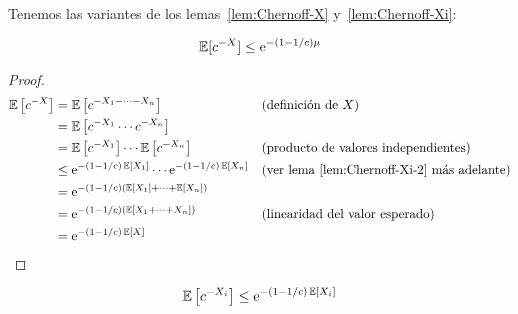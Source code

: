   Tenemos las variantes
  de los lemas~\ref{lem:Chernoff-X} y~\ref{lem:Chernoff-Xi}:
  \begin{lemma}
    \label{lem:Chernoff-X-2}
    \begin{equation*}
      \operatorname{\mathbb{E}}[c^{-X}]
        \le \mathrm{e}^{- (1 - 1 / c) \mu}
    \end{equation*}
  \end{lemma}
  \begin{proof}
    \begin{align*}
      \operatorname{\mathbb{E}}\left[ c^{-X} \right]
        &= \operatorname{\mathbb{E}}\left[ c^{-X_1 - \dotsb - X_n} \right]
               && \text{(definición de \(X\))} \\
        &=   \operatorname{\mathbb{E}}\left[ c^{-X_1} \dotsm c^{-X_n} \right] \\
        &=   \operatorname{\mathbb{E}}\left[ c^{-X_1} \right] \dotsm \operatorname{\mathbb{E}}\left[ c^{-X_n} \right]
               && \text{(producto de valores independientes)} \\
        &\le \mathrm{e}^{- (1 - 1 / c) \operatorname{\mathbb{E}}[X_1]}
               \dotsm \mathrm{e}^{- (1 - 1 / c) \operatorname{\mathbb{E}}[X_n]}
               && \text{(ver lema~\ref{lem:Chernoff-Xi-2} más adelante)} \\
        &= \mathrm{e}^{- (1 - 1 / c) (\operatorname{\mathbb{E}}[X_1] + \dotsb + \operatorname{\mathbb{E}}[X_n])} \\
        &= \mathrm{e}^{- (1 - 1 / c) (\operatorname{\mathbb{E}}[X_1 + \dotsb + X_n])}
               && \text{(linearidad del valor esperado)} \\
        &= \mathrm{e}^{- (1 - 1 / c) \operatorname{\mathbb{E}}[X]}
    \end{align*}
  \end{proof}
  \begin{lemma}
    \label{lem:Chernoff-Xi-2}
    \begin{equation*}
      \operatorname{\mathbb{E}}\left[ c^{-X_i} \right]
        \le \mathrm{e}^{- (1 - 1 / c) \operatorname{\mathbb{E}}[X_i]}
    \end{equation*}
  \end{lemma}
